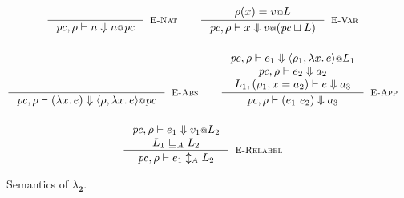 \documentclass{article}
\makeatletter
\newcommand{\at}{\ensuremath{{\scriptstyle{@}}}}
\newcommand{\pc}{\ensuremath{{\mathit{pc}}}}
\theoremstyle{definition}
\makeatother
\begin{document}
\begin{figure}[h]
  \centering
  \begin{gather*}
    \inference{}{
      \pc, \rho |- n \Downarrow n \at \pc
    }[\textsc{E-Nat}]
    \qquad
    \inference{
      \rho(x) = v \at L
    }{
      \pc, \rho |- x \Downarrow v \at (\pc \sqcup L)
    }[\textsc{E-Var}]
    \\[3ex]
    \inference{}{
      \pc, \rho |- (\lambda{x}.\, e) \Downarrow
      \langle{\rho, \lambda{x}.\, e\rangle} \at \pc
    }[\textsc{E-Abs}]
    \qquad
    \inference{
      \pc, \rho |- e_1 \Downarrow
      \langle{\rho_1, \lambda{x}.\, e\rangle} \at L_1
      \\
      \pc, \rho |- e_2 \Downarrow a_2
      \\
      L_1, (\rho_1, x = a_2) |- e \Downarrow a_3
    }{
      \pc, \rho |- (e_1\ e_2) \Downarrow a_3
    }[\textsc{E-App}]
    \\[3ex]
    \inference{
      \pc, \rho |- e_1 \Downarrow v_1 \at L_2
      \\
      L_1 \sqsubseteq_{A} L_2
    }{
      \pc, \rho |- e_1 \updownarrow_{A} L_2
    }[\textsc{E-Relabel}]
  \end{gather*}
  \caption{Semantics of $\lambda_{\mathbf{2}}$.}
  \label{fig:semantics}
\end{figure}

\pagebreak
\end{document}
